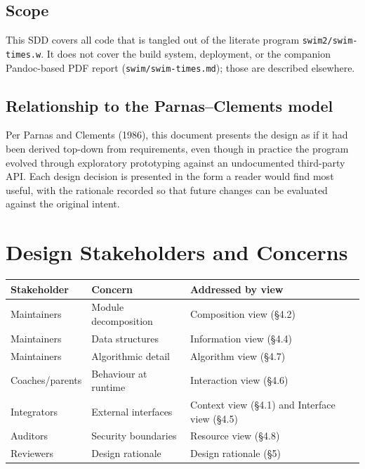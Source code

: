 \documentclass[12pt]{article}
\newcommand{\code}[1]{\texttt{#1}}
\begin{document}
\subsection{Scope}

This SDD covers all code that is tangled out of the literate
program \code{swim2/swim-times.w}.  It does not cover the
build system, deployment, or the companion Pandoc-based PDF
report (\code{swim/swim-times.md}); those are described
elsewhere.

\subsection{Relationship to the Parnas--Clements model}

Per Parnas and Clements (1986), this document presents the
design as if it had been derived top-down from requirements,
even though in practice the program evolved through exploratory
prototyping against an undocumented third-party API.  Each
design decision is presented in the form a reader would find
most useful, with the rationale recorded so that future changes
can be evaluated against the original intent.

\section{Design Stakeholders and Concerns}

\begin{center}
\begin{longtable}{p{3.5cm}p{3.5cm}p{6cm}}
  \toprule
  \textbf{Stakeholder} & \textbf{Concern} & \textbf{Addressed by view} \\
  \midrule\endhead
  Maintainers     & Module decomposition  & Composition view (\S4.2)        \\
  Maintainers     & Data structures       & Information view (\S4.4)        \\
  Maintainers     & Algorithmic detail    & Algorithm view (\S4.7)          \\
  Coaches/parents & Behaviour at runtime  & Interaction view (\S4.6)        \\
  Integrators     & External interfaces   & Context view (\S4.1) and Interface view (\S4.5) \\
  Auditors        & Security boundaries   & Resource view (\S4.8)           \\
  Reviewers       & Design rationale      & Design rationale (\S5)          \\
  \bottomrule
\end{longtable}
\end{center}
\end{document}
